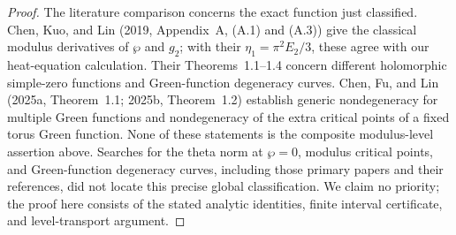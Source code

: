 \begin{proof}
The literature comparison concerns the exact function just
classified. Chen, Kuo, and Lin (2019, Appendix~A, (A.1) and
(A.3)) give the classical modulus derivatives of \(\wp\) and
\(g_2\); with their \(\eta_1=\pi^2E_2/3\), these agree with our
heat-equation calculation. Their Theorems~1.1--1.4 concern different
holomorphic simple-zero functions and Green-function degeneracy
curves. Chen, Fu, and Lin (2025a, Theorem~1.1; 2025b,
Theorem~1.2) establish generic nondegeneracy for multiple Green
functions and nondegeneracy of the extra critical points of a fixed
torus Green function. None of these statements is the composite
modulus-level assertion above. Searches for the theta norm at
\(\wp=0\), modulus critical points, and Green-function degeneracy
curves, including those primary papers and their references, did
not locate this precise global classification. We claim no priority;
the proof here consists of the stated analytic identities, finite
interval certificate, and level-transport argument.
\nocite{Buchdahl1999,Grauert60push,Grauert63push,CornulierChabauty,LinWang2010D,ChenKuoLin2019D,ChenFuLin2025GenericD,ChenFuLin2025HitchinD}
\end{proof}
